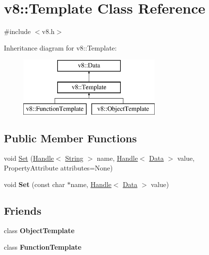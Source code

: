 \hypertarget{classv8_1_1_template}{}\section{v8\+:\+:Template Class Reference}
\label{classv8_1_1_template}


{\ttfamily \#include $<$v8.\+h$>$}

Inheritance diagram for v8\+:\+:Template\+:\begin{figure}[H]
\begin{center}
\leavevmode
\includegraphics[height=3.000000cm]{classv8_1_1_template}
\end{center}
\end{figure}
\subsection*{Public Member Functions}
\begin{DoxyCompactItemize}
\item 
void \hyperlink{classv8_1_1_template_a8a29557db5d0bc980752084b925a9b01}{Set} (\hyperlink{classv8_1_1_handle}{Handle}$<$ \hyperlink{classv8_1_1_string}{String} $>$ name, \hyperlink{classv8_1_1_handle}{Handle}$<$ \hyperlink{classv8_1_1_data}{Data} $>$ value, Property\+Attribute attributes=None)
\item 
\hypertarget{classv8_1_1_template_a2efda45d51b493bd30f254941b7c8310}{}void {\bfseries Set} (const char $\ast$name, \hyperlink{classv8_1_1_handle}{Handle}$<$ \hyperlink{classv8_1_1_data}{Data} $>$ value)\label{classv8_1_1_template_a2efda45d51b493bd30f254941b7c8310}

\end{DoxyCompactItemize}
\subsection*{Friends}
\begin{DoxyCompactItemize}
\item 
\hypertarget{classv8_1_1_template_a4d28646409234f556983be8a96c06424}{}class {\bfseries Object\+Template}\label{classv8_1_1_template_a4d28646409234f556983be8a96c06424}

\item 
\hypertarget{classv8_1_1_template_a334168ad1a5f39cf17b818ca3356aacd}{}class {\bfseries Function\+Template}\label{classv8_1_1_template_a334168ad1a5f39cf17b818ca3356aacd}

\end{DoxyCompactItemize}



